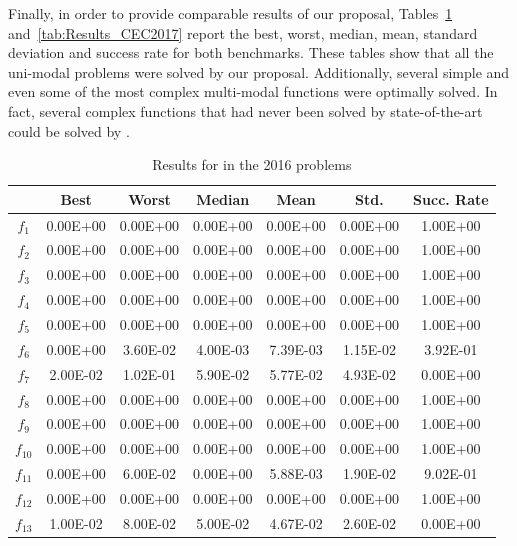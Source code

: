 Finally, in order to provide comparable results of our proposal, Tables~\ref{tab:Results_CEC2016} and~\ref{tab:Results_CEC2017} report the best, worst, median, 
mean, standard deviation and success rate for both benchmarks.
%
These tables show that all the uni-modal problems were solved by our proposal.
%
Additionally, several simple and even some of the most complex multi-modal functions were optimally solved.
%
In fact, several complex functions that had never been solved by state-of-the-art could be solved by \DEEDM{}.
%
\begin{table}[t]
\begin{scriptsize}
\centering
\caption{Results for \DEEDM{} in the \CEC{} 2016 problems}
\label{tab:Results_CEC2016}
\begin{tabular}{|c|c|c|c|c|c|c|}
\hline
 & \textbf{Best} & \textbf{Worst} & \textbf{Median} & \textbf{Mean} & \textbf{Std.} & \textbf{Succ. Rate} \\ \hline
$f_1$ & 0.00E+00 & 0.00E+00 & 0.00E+00 & 0.00E+00 & 0.00E+00 & 1.00E+00 \\ \hline
$f_2$ & 0.00E+00 & 0.00E+00 & 0.00E+00 & 0.00E+00 & 0.00E+00 & 1.00E+00 \\ \hline
$f_3$ & 0.00E+00 & 0.00E+00 & 0.00E+00 & 0.00E+00 & 0.00E+00 & 1.00E+00 \\ \hline
$f_4$ & 0.00E+00 & 0.00E+00 & 0.00E+00 & 0.00E+00 & 0.00E+00 & 1.00E+00 \\ \hline
$f_5$ & 0.00E+00 & 0.00E+00 & 0.00E+00 & 0.00E+00 & 0.00E+00 & 1.00E+00 \\ \hline
$f_6$ & 0.00E+00 & 3.60E-02 & 4.00E-03 & 7.39E-03 & 1.15E-02 & 3.92E-01 \\ \hline
$f_7$ & 2.00E-02 & 1.02E-01 & 5.90E-02 & 5.77E-02 & 4.93E-02 & 0.00E+00 \\ \hline
$f_8$ & 0.00E+00 & 0.00E+00 & 0.00E+00 & 0.00E+00 & 0.00E+00 & 1.00E+00 \\ \hline
$f_9$ & 0.00E+00 & 0.00E+00 & 0.00E+00 & 0.00E+00 & 0.00E+00 & 1.00E+00 \\ \hline
$f_{10}$ & 0.00E+00 & 0.00E+00 & 0.00E+00 & 0.00E+00 & 0.00E+00 & 1.00E+00 \\ \hline
$f_{11}$ & 0.00E+00 & 6.00E-02 & 0.00E+00 & 5.88E-03 & 1.90E-02 & 9.02E-01 \\ \hline
$f_{12}$ & 0.00E+00 & 0.00E+00 & 0.00E+00 & 0.00E+00 & 0.00E+00 & 1.00E+00 \\ \hline
$f_{13}$ & 1.00E-02 & 8.00E-02 & 5.00E-02 & 4.67E-02 & 2.60E-02 & 0.00E+00 \\ \hline

\end{tabular}
\end{scriptsize}
\end{table}
